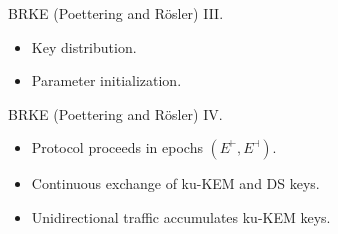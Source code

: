 \documentclass{beamer}
\begin{document}
\begin{frame}{BRKE (Poettering and Rösler) III.}
  \scriptsize
   \begin{minipage}[h]{0.59\textwidth}
      \begin{figure}[h]
        \centering
        \setlength{\fboxsep}{10pt}
        \scalebox{0.7}{%
        \fbox{%
          
        }
      }
    \end{figure}
    \end{minipage}
   \begin{minipage}[h]{0.40\textwidth}
      \begin{itemize}
      \item Key distribution.
      \item Parameter initialization.
      \end{itemize}
  \end{minipage}
\end{frame}

\begin{frame}{BRKE (Poettering and Rösler) IV.}
  \scriptsize
  \begin{figure}[h]
        \centering
        \setlength{\fboxsep}{10pt}
        \scalebox{0.6}{%
        \fbox{%
          
        }
      }
    \end{figure}
       \begin{itemize}
       \item Protocol proceeds in epochs $(E^\vdash,E^\dashv)$.
       \item Continuous exchange of ku-KEM and DS keys.
       \item Unidirectional traffic accumulates ku-KEM keys.
       \end{itemize}


\end{frame}
\end{document}

